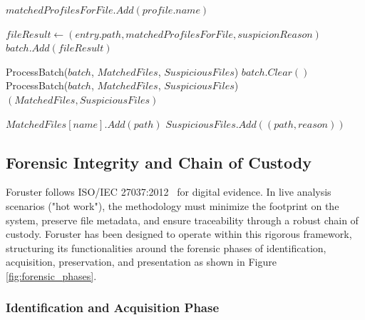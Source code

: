 \documentclass[preprint,12pt,a4paper]{elsarticle}
\begin{document}
\begin{algorithm}[htb]
\begin{algorithmic}[1]
            \Statex {}
                 
                    \State $matchedProfilesForFile.Add(profile.name)$
                \EndIf
            \EndFor

            \State $fileResult \gets (entry.path, matchedProfilesForFile, suspicionReason)$
            \State $batch.Add(fileResult)$

                \State ProcessBatch($batch$, $MatchedFiles$, $SuspiciousFiles$)
                \State $batch.Clear()$
            \EndIf
        \EndIf
    \EndFor
     
        \State ProcessBatch($batch$, $MatchedFiles$, $SuspiciousFiles$)
    \EndIf
\EndFor
\State \Return $(MatchedFiles, SuspiciousFiles)$

\Statex
{}
                \State $MatchedFiles[name].Add(path)$
            \EndFor
             
                \State $SuspiciousFiles.Add((path, reason))$
            \EndIf
        \EndIf
    \EndFor
\EndProcedure

\end{algorithmic}
\end{algorithm}


\subsection{Forensic Integrity and Chain of Custody}

Foruster follows ISO/IEC 27037:2012~\cite{iso27037} for digital evidence. In live analysis scenarios ("hot work"), the methodology must minimize the footprint on the system, preserve file metadata, and ensure traceability through a robust chain of custody. Foruster
has been designed to operate within this rigorous framework, structuring its functionalities around the forensic phases of identification, acquisition, preservation, and presentation as shown in Figure \ref{fig:forensic_phases}.

\subsubsection{Identification and Acquisition Phase}
\end{document}
